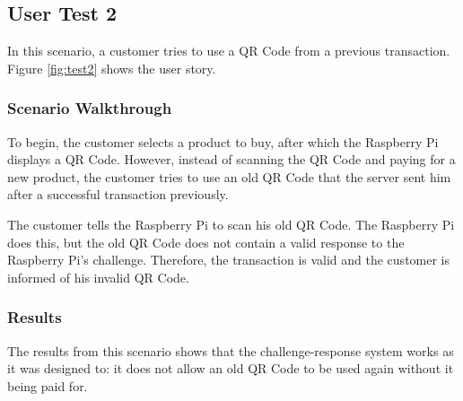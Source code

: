 \subsection{User Test 2}

In this scenario, a customer tries to use a QR Code from a previous transaction. Figure
\ref{fig:test2} shows the user story.

\subsubsection{Scenario Walkthrough}

To begin, the customer selects a product to buy, after which the Raspberry Pi displays a
QR Code. However, instead of scanning the QR Code and paying for a new product, the
customer tries to use an old QR Code that the server sent him after a successful
transaction previously. 

The customer tells the Raspberry Pi to scan his old QR Code. The Raspberry Pi does
this, but the old QR Code does not contain a valid response to the Raspberry Pi's
challenge. Therefore, the transaction is valid and the customer is informed of his
invalid QR Code.

\subsubsection{Results}

The results from this scenario shows that the challenge-response system works as it was
designed to: it does not allow an old QR Code to be used again without it being paid for. 

